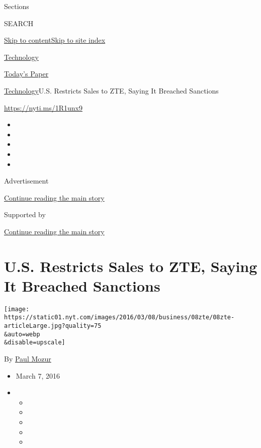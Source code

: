 Sections

SEARCH

\protect\hyperlink{site-content}{Skip to
content}\protect\hyperlink{site-index}{Skip to site index}

\href{https://www.nytimes.com/section/technology}{Technology}

\href{https://myaccount.nytimes.com/auth/login?response_type=cookie\&client_id=vi}{}

\href{https://www.nytimes.com/section/todayspaper}{Today's Paper}

\href{/section/technology}{Technology}\textbar{}U.S. Restricts Sales to
ZTE, Saying It Breached Sanctions

\url{https://nyti.ms/1R1unx9}

\begin{itemize}
\item
\item
\item
\item
\item
\end{itemize}

Advertisement

\protect\hyperlink{after-top}{Continue reading the main story}

Supported by

\protect\hyperlink{after-sponsor}{Continue reading the main story}

\hypertarget{us-restricts-sales-to-zte-saying-it-breached-sanctions}{%
\section{U.S. Restricts Sales to ZTE, Saying It Breached
Sanctions}\label{us-restricts-sales-to-zte-saying-it-breached-sanctions}}

\texttt{[image: https://static01.nyt.com/images/2016/03/08/business/08zte/08zte-articleLarge.jpg?quality=75\\\&auto=webp\\\&disable=upscale]}

By \href{https://www.nytimes.com/by/paul-mozur}{Paul Mozur}

\begin{itemize}
\item
  March 7, 2016
\item
  \begin{itemize}
  \item
  \item
  \item
  \item
  \item
  \end{itemize}
\end{itemize}

